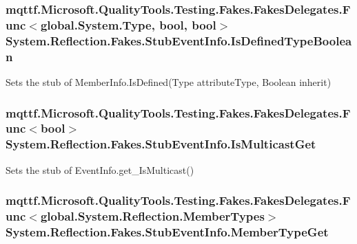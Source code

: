 \hypertarget{class_system_1_1_reflection_1_1_fakes_1_1_stub_event_info_a80ff0106f3e73004a2832250251f3120}{
\subsubsection[{Is\-Defined\-Type\-Boolean}]{\setlength{\rightskip}{0pt plus 5cm}mqttf.\-Microsoft.\-Quality\-Tools.\-Testing.\-Fakes.\-Fakes\-Delegates.\-Func$<$global.\-System.\-Type, bool, bool$>$ System.\-Reflection.\-Fakes.\-Stub\-Event\-Info.\-Is\-Defined\-Type\-Boolean}}\label{class_system_1_1_reflection_1_1_fakes_1_1_stub_event_info_a80ff0106f3e73004a2832250251f3120}


Sets the stub of Member\-Info.\-Is\-Defined(\-Type attribute\-Type, Boolean inherit)

\hypertarget{class_system_1_1_reflection_1_1_fakes_1_1_stub_event_info_afe85e7487a8e28f19cc7da533d77698d}{
\subsubsection[{Is\-Multicast\-Get}]{\setlength{\rightskip}{0pt plus 5cm}mqttf.\-Microsoft.\-Quality\-Tools.\-Testing.\-Fakes.\-Fakes\-Delegates.\-Func$<$bool$>$ System.\-Reflection.\-Fakes.\-Stub\-Event\-Info.\-Is\-Multicast\-Get}}\label{class_system_1_1_reflection_1_1_fakes_1_1_stub_event_info_afe85e7487a8e28f19cc7da533d77698d}


Sets the stub of Event\-Info.\-get\-\_\-\-Is\-Multicast()

\hypertarget{class_system_1_1_reflection_1_1_fakes_1_1_stub_event_info_a94e0a32c474604fca52d7eed50c28c7c}{
\subsubsection[{Member\-Type\-Get}]{\setlength{\rightskip}{0pt plus 5cm}mqttf.\-Microsoft.\-Quality\-Tools.\-Testing.\-Fakes.\-Fakes\-Delegates.\-Func$<$global.\-System.\-Reflection.\-Member\-Types$>$ System.\-Reflection.\-Fakes.\-Stub\-Event\-Info.\-Member\-Type\-Get}}\label{class_system_1_1_reflection_1_1_fakes_1_1_stub_event_info_a94e0a32c474604fca52d7eed50c28c7c}


